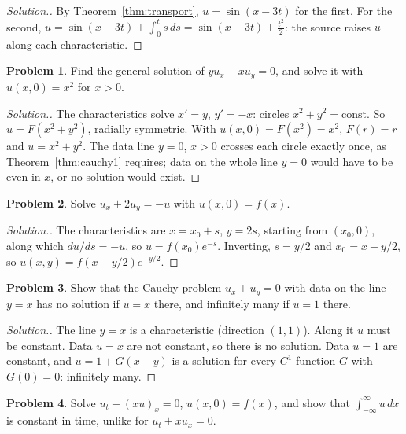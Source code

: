 \documentclass[11pt,a4paper]{article}
\numberwithin{equation}{section}
\theoremstyle{definition}
\newtheorem{problemx}{Problem}[subsection]
\newenvironment{problem}{\begin{problemx}}{\end{problemx}}
\newenvironment{solution}
  {\renewcommand{\qedsymbol}{}\begin{proof}[\textit{Solution}.]}
  {\end{proof}}
\begin{document}
\begin{solution}
By Theorem~\ref{thm:transport}, $u = \sin(x - 3t)$ for the first. For the second, $u = \sin(x - 3t) + \int_0^ts\,ds = \sin(x - 3t) + \frac{t^2}{2}$: the source raises $u$ along each characteristic.
\end{solution}

\begin{problem}
Find the general solution of $yu_x - xu_y = 0$, and solve it with $u(x, 0) = x^2$ for $x > 0$.
\end{problem}

\begin{solution}
The characteristics solve $x' = y$, $y' = -x$: circles $x^2 + y^2 = \text{const}$. So $u = F(x^2 + y^2)$, radially symmetric. With $u(x, 0) = F(x^2) = x^2$, $F(r) = r$ and $u = x^2 + y^2$. The data line $y = 0$, $x > 0$ crosses each
circle exactly once, as Theorem~\ref{thm:cauchy1} requires; data on the whole line $y = 0$ would have to be even in $x$, or no solution would exist.
\end{solution}

\begin{problem}
Solve $u_x + 2u_y = -u$ with $u(x, 0) = f(x)$.
\end{problem}

\begin{solution}
The characteristics are $x = x_0 + s$, $y = 2s$, starting from $(x_0, 0)$, along which $du/ds = -u$, so $u = f(x_0)e^{-s}$. Inverting, $s = y/2$ and $x_0 = x - y/2$, so $u(x, y) = f(x - y/2)e^{-y/2}$.
\end{solution}

\begin{problem}
Show that the Cauchy problem $u_x + u_y = 0$ with data on the line $y = x$ has no solution if $u = x$ there, and infinitely many if $u = 1$ there.
\end{problem}

\begin{solution}
The line $y = x$ is a characteristic (direction $(1, 1)$). Along it $u$ must be constant. Data $u = x$ are not constant, so there is no solution. Data $u = 1$ are constant, and $u = 1 + G(x - y)$ is a solution for every $C^1$
function $G$ with $G(0) = 0$: infinitely many.
\end{solution}

\begin{problem}
Solve $u_t + (xu)_x = 0$, $u(x, 0) = f(x)$, and show that $\int_{-\infty}^\infty u\,dx$ is constant in time, unlike for $u_t + xu_x = 0$.
\end{problem}
\end{document}
